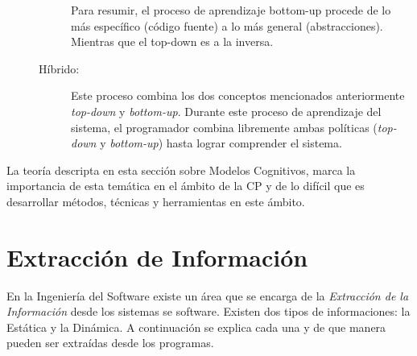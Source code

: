 \begin{description}
\begin{description}
Para resumir, el proceso de aprendizaje bottom-up procede de lo más específico (código fuente) a lo más general (abstracciones). Mientras que el top-down es a la inversa.

\item[Híbrido:] Este proceso combina los dos conceptos mencionados anteriormente \textit{top-down} y \textit{bottom-up}. Durante este proceso de aprendizaje del sistema, el programador combina libremente ambas políticas (\textit{top-down} y \textit{bottom-up}) hasta lograr comprender el sistema.
\end{description}
\end{description}


La teoría descripta en esta sección sobre Modelos Cognitivos, marca la importancia de esta temática en el ámbito de la CP y de lo difícil que es desarrollar métodos, técnicas y herramientas en este ámbito.


\section{Extracción de Información}

En la Ingeniería del Software existe un área que se encarga de la \textit{Extracción de la Información} desde los sistemas se software. 
Existen dos tipos de informaciones: la Estática y la Dinámica. A continuación se explica cada una y de que manera pueden ser extraídas desde los programas.

